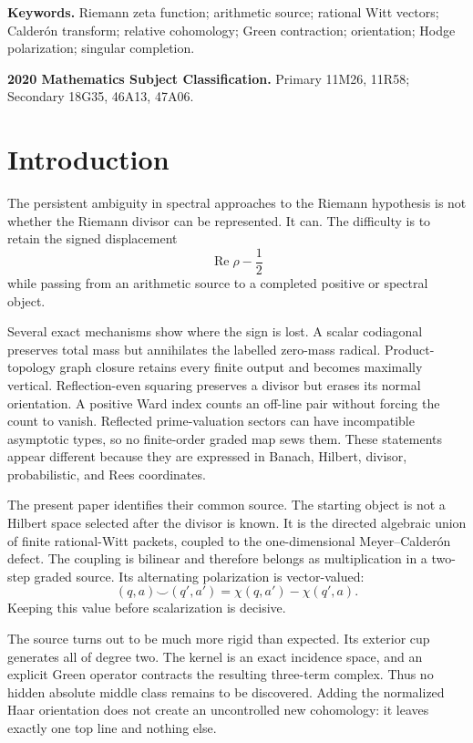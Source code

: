 \documentclass[11pt]{article}
\theoremstyle{definition}
\theoremstyle{remark}
\newcommand{\Rea}{\operatorname{Re}}
\begin{document}
\medskip
\noindent\textbf{Keywords.}
Riemann zeta function; arithmetic source; rational Witt vectors;
Calder\'on transform; relative cohomology; Green contraction;
orientation; Hodge polarization; singular completion.

\medskip
\noindent\textbf{2020 Mathematics Subject Classification.}
Primary 11M26, 11R58; Secondary 18G35, 46A13, 47A06.

\section{Introduction}

The persistent ambiguity in spectral approaches to the Riemann hypothesis
is not whether the Riemann divisor can be represented.  It can.  The
difficulty is to retain the signed displacement
\[
                         \Rea\rho-\frac12
\tag{1.1}\label{eq:signed-displacement}
\]
while passing from an arithmetic source to a completed positive or
spectral object.

Several exact mechanisms show where the sign is lost.  A scalar
codiagonal preserves total mass but annihilates the labelled zero-mass
radical.  Product-topology graph closure retains every finite output and
becomes maximally vertical.  Reflection-even squaring preserves a divisor
but erases its normal orientation.  A positive Ward index counts an
off-line pair without forcing the count to vanish.  Reflected
prime-valuation sectors can have incompatible asymptotic types, so no
finite-order graded map sews them.  These statements appear different
because they are expressed in Banach, Hilbert, divisor, probabilistic, and
Rees coordinates.

The present paper identifies their common source.  The starting object is
not a Hilbert space selected after the divisor is known.  It is the
directed algebraic union of finite rational-Witt packets, coupled to the
one-dimensional Meyer--Calder\'on defect.  The coupling is bilinear and
therefore belongs as multiplication in a two-step graded source.  Its
alternating polarization is vector-valued:
\[
  (q,a)\smile(q',a')
     =\chi(q,a')-\chi(q',a).
\tag{1.2}\label{eq:cup-intro}
\]
Keeping this value before scalarization is decisive.

The source turns out to be much more rigid than expected.  Its exterior cup
generates all of degree two.  The kernel is an exact incidence space, and
an explicit Green operator contracts the resulting three-term complex.
Thus no hidden absolute middle class remains to be discovered.  Adding the
normalized Haar orientation does not create an uncontrolled new
cohomology: it leaves exactly one top line and nothing else.
\end{document}
